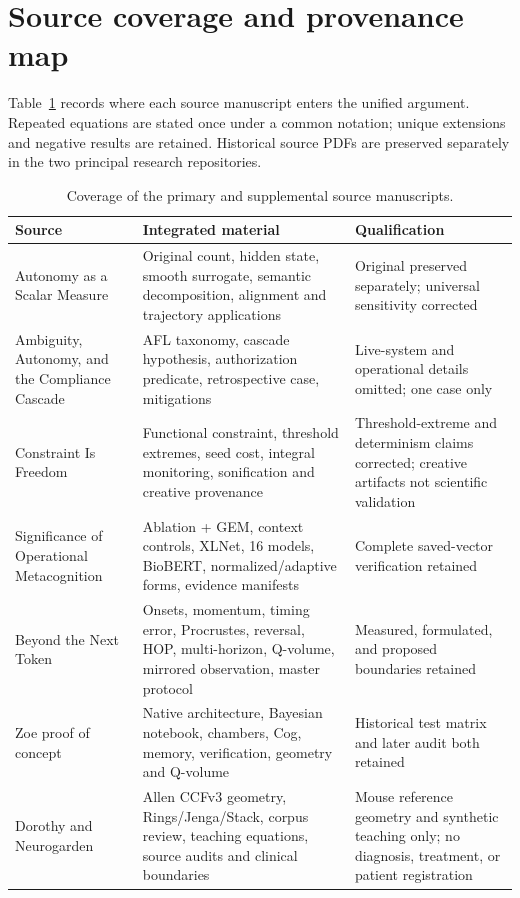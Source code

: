 \section{Source coverage and provenance map}
\label{app:source-coverage}
Table~\ref{tab:source-coverage} records where each source manuscript enters the unified argument. Repeated equations are stated once under a common notation; unique extensions and negative results are retained. Historical source PDFs are preserved separately in the two principal research repositories.
\begin{table}[htbp]
\centering
\caption{Coverage of the primary and supplemental source manuscripts.}
\label{tab:source-coverage}
{\scriptsize
\begin{tabularx}{\textwidth}{p{4.0cm}Xp{3.5cm}}
\toprule
Source&Integrated material&Qualification\\
\midrule
Autonomy as a Scalar Measure&Original count, hidden state, smooth surrogate, semantic decomposition, alignment and trajectory applications&Original preserved separately; universal sensitivity corrected\\
Ambiguity, Autonomy, and the Compliance Cascade&AFL taxonomy, cascade hypothesis, authorization predicate, retrospective case, mitigations&Live-system and operational details omitted; one case only\\
Constraint Is Freedom&Functional constraint, threshold extremes, seed cost, integral monitoring, sonification and creative provenance&Threshold-extreme and determinism claims corrected; creative artifacts not scientific validation\\
Significance of Operational Metacognition&Ablation + GEM, context controls, XLNet, 16 models, BioBERT, normalized/adaptive forms, evidence manifests&Complete saved-vector verification retained\\
Beyond the Next Token&Onsets, momentum, timing error, Procrustes, reversal, HOP, multi-horizon, Q-volume, mirrored observation, master protocol&Measured, formulated, and proposed boundaries retained\\
Zoe proof of concept&Native architecture, Bayesian notebook, chambers, Cog, memory, verification, geometry and Q-volume&Historical test matrix and later audit both retained\\
Dorothy and Neurogarden&Allen CCFv3 geometry, Rings/Jenga/Stack, corpus review, teaching equations, source audits and clinical boundaries&Mouse reference geometry and synthetic teaching only; no diagnosis, treatment, or patient registration\\

\end{tabularx}}
\end{table}
